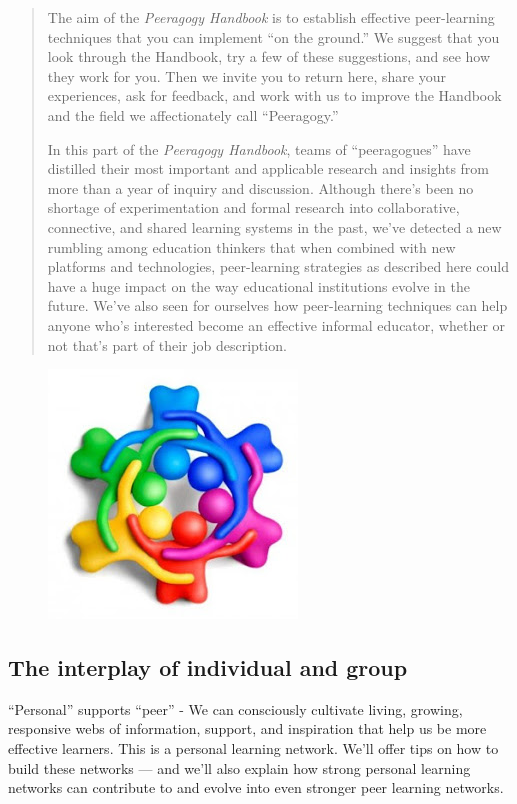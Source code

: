 \begin{quote}
The aim of the \emph{Peeragogy Handbook} is to establish effective
peer-learning techniques that you can implement ``on the ground.'' We
suggest that you look through the Handbook, try a few of these
suggestions, and see how they work for you. Then we invite you to return
here, share your experiences, ask for feedback, and work with us to
improve the Handbook and the field we affectionately call ``Peeragogy.''

In this part of the \emph{Peeragogy Handbook}, teams of ``peeragogues''
have distilled their most important and applicable research and insights
from more than a year of inquiry and discussion. Although there's been
no shortage of experimentation and formal research into collaborative,
connective, and shared learning systems in the past, we've detected a
new rumbling among education thinkers that when combined with new
platforms and technologies, peer-learning strategies as described here
could have a huge impact on the way educational institutions evolve in
the future. We've also seen for ourselves how peer-learning techniques
can help anyone who's interested become an effective informal educator,
whether or not that's part of their job description.
\end{quote}

\begin{figure}[htbp]
\centering
\includegraphics[width=.4\textwidth]{../pictures/peeragogy-in-action.jpg}
\end{figure}

\subsection{The interplay of individual and group}

``Personal'' supports ``peer'' - We can consciously cultivate living,
growing, responsive webs of information, support, and inspiration that
help us be more effective learners. This is a personal learning network.
We'll offer tips on how to build these networks --- and we'll also
explain how strong personal learning networks can contribute to and
evolve into even stronger peer learning networks.

